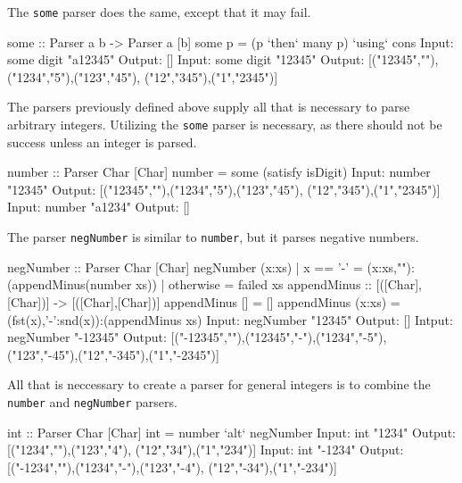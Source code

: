 \documentclass[11pt]{article}
\begin{document}
The \texttt{some} parser does the same, except that it may fail. 

\hspace{2cm}\begin{verbbox}
some :: Parser a b -> Parser a [b] 
some p = (p `then` many p) `using` cons
Input:  some digit "a12345" 
Output: []
Input:  some digit "12345"
Output: [("12345",""),("1234","5"),("123","45"),
                      ("12","345"),("1","2345")]
\end{verbbox}
\theverbbox

The parsers previously defined above supply all that is necessary to parse arbitrary integers. Utilizing the \texttt{some} parser is necessary, as there should not be success unless an integer is parsed.

\hspace{2cm}\begin{verbbox}
number :: Parser Char [Char] 
number = some (satisfy isDigit)
Input:  number "12345" 
Output: [("12345",""),("1234","5"),("123","45"),
                      ("12","345"),("1","2345")]
Input:  number "a1234" 
Output: []
\end{verbbox}
\theverbbox

The parser \texttt{negNumber} is similar to \texttt{number}, but it parses negative numbers. 

\hspace{2cm}\begin{verbbox}
negNumber :: Parser Char [Char] 
negNumber (x:xs) | x == '-' = (x:xs,""): (appendMinus(number xs)) 
                 | otherwise = failed xs 
appendMinus :: [([Char],[Char])] -> [([Char],[Char])]
appendMinus [] = []
appendMinus (x:xs) = (fst(x),'-':snd(x)):(appendMinus xs)
Input:  negNumber "12345" 
Output: [] 
Intput: negNumber "-12345" 
Output: [("-12345",""),("12345","-"),("1234","-5"),
         ("123","-45"),("12","-345"),("1","-2345")]
\end{verbbox}
\theverbbox

All that is neccessary to create a parser for general integers is to combine the \texttt{number} and \texttt{negNumber} parsers.

\hspace{2cm}\begin{verbbox}
int :: Parser Char [Char] 
int = number `alt` negNumber 
Input:  int "1234" 
Output: [("1234",""),("123","4"),
         ("12","34"),("1","234")] 
Input:  int "-1234" 
Output: [("-1234",""),("1234","-"),("123","-4"),
                      ("12","-34"),("1","-234")]
\end{verbbox}
\theverbbox
\end{document}
